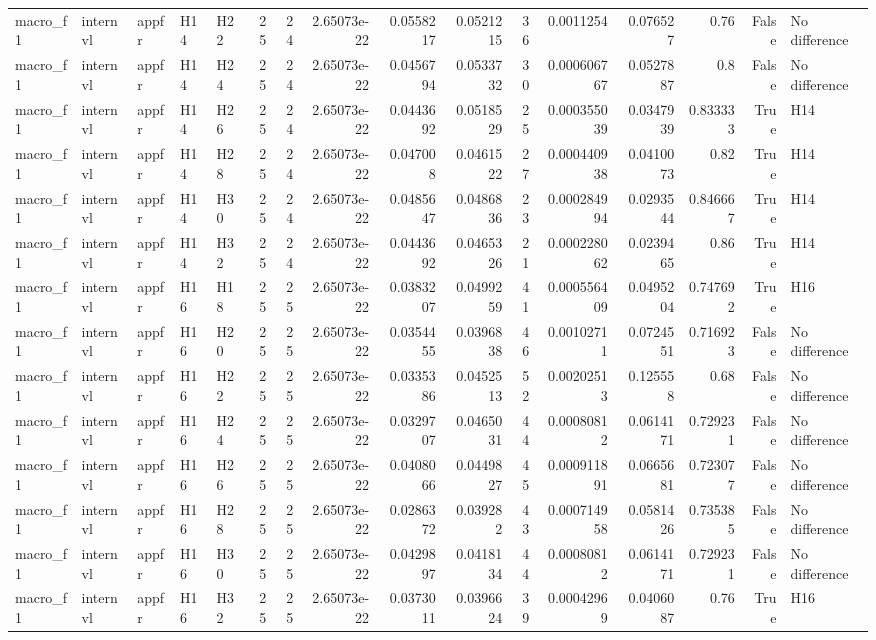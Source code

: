 \begin{longtable}{lllllrrrrrrrrrrl}
macro\_f1 & internvl & appfr & H14 & H22 & 25 & 24 & 2.65073e-22 & 0.0558217 & 0.0521215 & 36 & 0.0011254 & 0.076527 & 0.76 & False & No difference \\
macro\_f1 & internvl & appfr & H14 & H24 & 25 & 24 & 2.65073e-22 & 0.0456794 & 0.0533732 & 30 & 0.000606767 & 0.0527887 & 0.8 & False & No difference \\
macro\_f1 & internvl & appfr & H14 & H26 & 25 & 24 & 2.65073e-22 & 0.0443692 & 0.0518529 & 25 & 0.000355039 & 0.0347939 & 0.833333 & True & H14 \\
macro\_f1 & internvl & appfr & H14 & H28 & 25 & 24 & 2.65073e-22 & 0.047008 & 0.0461522 & 27 & 0.000440938 & 0.0410073 & 0.82 & True & H14 \\
macro\_f1 & internvl & appfr & H14 & H30 & 25 & 24 & 2.65073e-22 & 0.0485647 & 0.0486836 & 23 & 0.000284994 & 0.0293544 & 0.846667 & True & H14 \\
macro\_f1 & internvl & appfr & H14 & H32 & 25 & 24 & 2.65073e-22 & 0.0443692 & 0.0465326 & 21 & 0.000228062 & 0.0239465 & 0.86 & True & H14 \\
macro\_f1 & internvl & appfr & H16 & H18 & 25 & 25 & 2.65073e-22 & 0.0383207 & 0.0499259 & 41 & 0.000556409 & 0.0495204 & 0.747692 & True & H16 \\
macro\_f1 & internvl & appfr & H16 & H20 & 25 & 25 & 2.65073e-22 & 0.0354455 & 0.0396838 & 46 & 0.00102711 & 0.0724551 & 0.716923 & False & No difference \\
macro\_f1 & internvl & appfr & H16 & H22 & 25 & 25 & 2.65073e-22 & 0.0335386 & 0.0452513 & 52 & 0.00202513 & 0.125558 & 0.68 & False & No difference \\
macro\_f1 & internvl & appfr & H16 & H24 & 25 & 25 & 2.65073e-22 & 0.0329707 & 0.0465031 & 44 & 0.00080812 & 0.0614171 & 0.729231 & False & No difference \\
macro\_f1 & internvl & appfr & H16 & H26 & 25 & 25 & 2.65073e-22 & 0.0408066 & 0.0449827 & 45 & 0.000911891 & 0.0665681 & 0.723077 & False & No difference \\
macro\_f1 & internvl & appfr & H16 & H28 & 25 & 25 & 2.65073e-22 & 0.0286372 & 0.039282 & 43 & 0.000714958 & 0.0581426 & 0.735385 & False & No difference \\
macro\_f1 & internvl & appfr & H16 & H30 & 25 & 25 & 2.65073e-22 & 0.0429897 & 0.0418134 & 44 & 0.00080812 & 0.0614171 & 0.729231 & False & No difference \\
macro\_f1 & internvl & appfr & H16 & H32 & 25 & 25 & 2.65073e-22 & 0.0373011 & 0.0396624 & 39 & 0.00042969 & 0.0406087 & 0.76 & True & H16 \\

\end{longtable}
